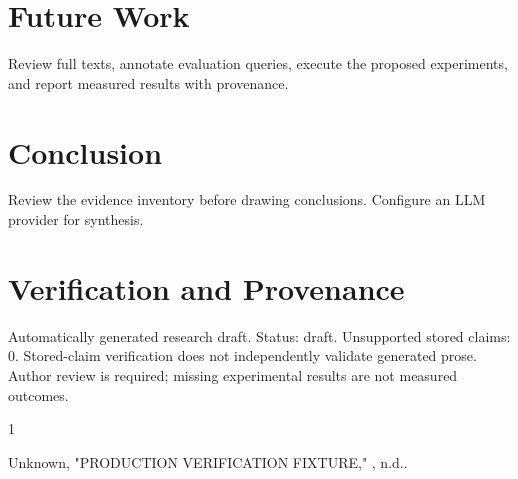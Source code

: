 \documentclass[conference]{IEEEtran}
\begin{document}
\section{Future Work}

Review full texts, annotate evaluation queries, execute the proposed experiments, and report measured results with provenance.

\section{Conclusion}

Review the evidence inventory before drawing conclusions. Configure an LLM provider for synthesis.

\section{Verification and Provenance}

Automatically generated research draft. Status: draft. Unsupported stored claims: 0. Stored-claim verification does not independently validate generated prose. Author review is required; missing experimental results are not measured outcomes.

\begin{thebibliography}{1}

 Unknown, "PRODUCTION VERIFICATION FIXTURE," , n.d..

\end{thebibliography}
\end{document}
